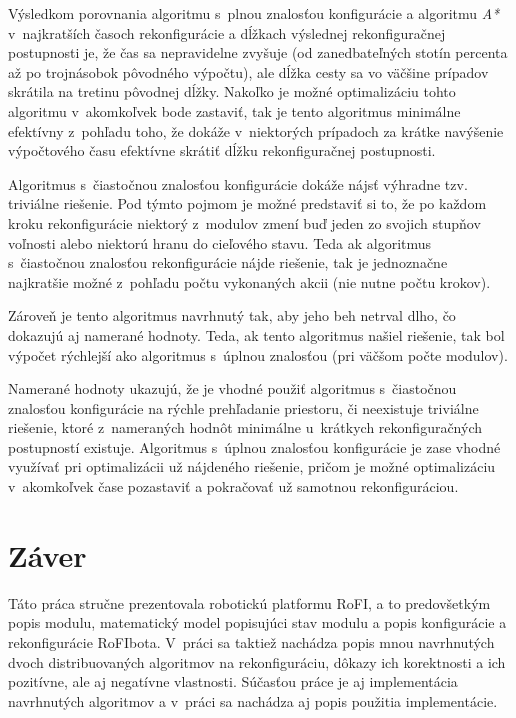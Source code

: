 \documentclass[
  printed, %
  oneside, %
  notable,   %
  nolof,     %
  nolot,     %
]{fithesis3}
\begin{document}
Výsledkom porovnania algoritmu s~plnou znalosťou konfigurácie a algoritmu \textit{A*} v~najkratších časoch rekonfigurácie a dĺžkach výslednej rekonfiguračnej postupnosti je, že čas sa nepravidelne zvyšuje (od zanedbateľných stotín percenta až po trojnásobok pôvodného výpočtu), ale dĺžka cesty sa vo väčšine prípadov skrátila na tretinu pôvodnej dĺžky. Nakoľko je možné optimalizáciu tohto algoritmu v~akomkoľvek bode zastaviť, tak je tento algoritmus minimálne efektívny z~pohľadu toho, že dokáže v~niektorých prípadoch za krátke navýšenie výpočtového času efektívne skrátiť dĺžku rekonfiguračnej postupnosti. 

Algoritmus s~čiastočnou znalosťou konfigurácie dokáže nájsť výhradne tzv. triviálne riešenie. Pod týmto pojmom je možné predstaviť si to, že po každom kroku rekonfigurácie niektorý z~modulov zmení buď jeden zo svojich stupňov voľnosti alebo niektorú hranu do cieľového stavu. Teda ak algoritmus s~čiastočnou znalosťou rekonfigurácie nájde riešenie, tak je jednoznačne najkratšie možné z~pohľadu počtu vykonaných akcii (nie nutne počtu krokov). 

Zároveň je tento algoritmus navrhnutý tak, aby jeho beh netrval dlho, čo dokazujú aj namerané hodnoty. Teda, ak tento algoritmus našiel riešenie, tak bol výpočet rýchlejší ako algoritmus s~úplnou znalosťou (pri väčšom počte modulov). 

Namerané hodnoty ukazujú, že je vhodné použiť algoritmus s~čiastočnou znalosťou konfigurácie na rýchle prehľadanie priestoru, či neexistuje triviálne riešenie, ktoré z~nameraných hodnôt minimálne u~krátkych rekonfiguračných postupností existuje. Algoritmus s~úplnou znalosťou konfigurácie je zase vhodné využívať pri optimalizácii už nájdeného riešenie, pričom je možné optimalizáciu v~akomkoľvek čase pozastaviť a pokračovať už samotnou rekonfiguráciou. 







\chapter{Záver}
Táto práca stručne prezentovala robotickú platformu RoFI, a to predovšetkým popis modulu, matematický model popisujúci stav modulu a popis konfigurácie a rekonfigurácie RoFIbota. V~práci sa taktiež nachádza popis mnou navrhnutých dvoch distribuovaných algoritmov na rekonfiguráciu, dôkazy ich korektnosti a ich pozitívne, ale aj negatívne vlastnosti. Súčasťou práce je aj implementácia navrhnutých algoritmov a v~práci sa nachádza aj popis použitia implementácie. 
\end{document}
